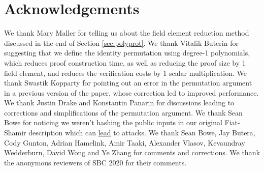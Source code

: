 \documentclass[11pt]{article} %
\newcommand{\chalpoint}{\ensuremath{\mathfrak{z}}\xspace}
\newcommand{\sigpolyevala}{\ensuremath{\mathsf{\bar{s}_{\sigma1}}}\xspace}
\newcommand{\sigpolyevalb}{\ensuremath{\mathsf{\bar{s}_{\sigma2}}}\xspace}
\newcommand{\sigcomma}{\ensuremath{[s_{\mathsf{\sigma1}}]_1}\xspace}
\newcommand{\sigcommb}{\ensuremath{[s_{\mathsf{\sigma2}}]_1}\xspace}
\begin{document}



 \section*{Acknowledgements} We thank Mary Maller for telling us about the field element reduction method discussed in the end of Section \ref{sec:polyprot}. We thank Vitalik Buterin for suggesting that we define the identity permutation using degree-1 polynomials, which reduces proof construction time, as well as reducing the proof size by 1 field element, and reduces the verification costs by 1 scalar multiplication. We thank Swastik Kopparty for pointing out an error in the permutation argument in a previous version of the paper, whose correction led to improved performance. We thank Justin Drake and Konstantin Panarin for discussions leading to corrections and simplifications of the permutation argument. We thank Sean Bowe for noticing we weren't hashing the public inputs in our original Fiat-Shamir description which can \href{https://blog.trailofbits.com/2022/04/18/the-frozen-heart-vulnerability-in-plonk/}{lead} to attacks. We thank Sean Bowe, Jay Butera, Cody Gunton, Adrian Hamelink, Amir Taaki, Alexander Vlasov, Kevaundray Wedderburn, David Wong and Ye Zhang for comments and corrections. We thank the anonymous reviewers of SBC 2020 for their comments.

    
\end{document}
